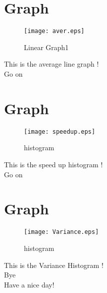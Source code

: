 \documentclass{article}
\begin{document}
\section{Graph}
\begin{figure}[H]
    \centering
    \texttt{[image: aver.eps]}
    \caption{Linear Graph1}
    \label{fig:my_label}
\end{figure}
This is the average line graph !\\
Go on\\
\section{Graph}
\begin{figure}[H]
    \centering
    \texttt{[image: speedup.eps]}
    \caption{histogram}
    \label{fig:my_label}
\end{figure}
This is the speed up histogram !\\
Go on\\
\section{Graph}
\begin{figure}[H]
    \centering
    \texttt{[image: Variance.eps]}
    \caption{histogram}
    \label{fig:my_label}
\end{figure}
This is the Variance Histogram !\\
Bye \\
Have a nice day!\\
\end{document}
